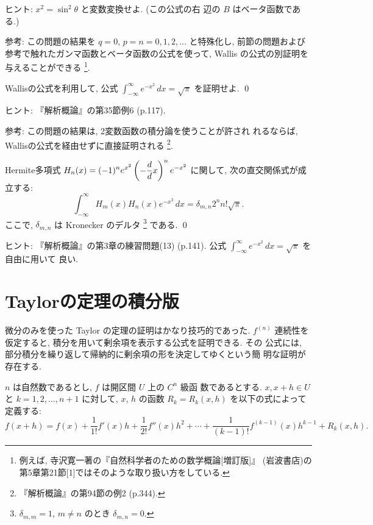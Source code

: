 \documentclass[12pt,twoside]{jarticle}
\begin{document}
\noindent ヒント: $x^2 = \sin^2 \theta$ と変数変換せよ. (この公式の右
辺の $B$ はベータ函数である.)

\noindent 参考: この問題の結果を $q=0$, $p=n=0,1,2,\ldots$ と特殊化し,
前節の問題および参考で触れたガンマ函数とベータ函数の公式を使って,
Wallis の公式の別証明を与えることができる%
\footnote{例えば, 寺沢寛一著の『自然科学者のための数学概論[増訂版]』 
  (岩波書店)の第5章第21節[1]ではそのような取り扱い方をしている.}.

\begin{question}\label{q:int-exp-x2}
  Wallisの公式を利用して, %
  公式 $\displaystyle \int_{-\infty}^\infty e^{-x^2}\,dx = \sqrt{\pi}$ %
  を証明せよ.  \qed
\end{question}

\noindent ヒント: 『解析概論』の第35節例6 (p.117). 

\noindent 参考: この問題の結果は, 2変数函数の積分論を使うことが許され
れるならば, Wallisの公式を経由せずに直接証明される%
\footnote{『解析概論』の第94節の例2 (p.344).}.

\begin{question}[Hermite多項式の直交関係式]
  Hermite多項式 %
  \( \displaystyle
    H_n(x) = (-1)^n e^{x^2} \left( -\frac{d}{d }{x} \right)^n e^{-x^2}
  \) %
  に関して, 次の直交関係式が成立する:
  \[
    \int_{-\infty}^\infty H_m(x) H_n(x) e^{-x^2}\,dx
    = \delta_{m,n} 2^n n! \sqrt{\pi}.
  \]
  ここで, $\delta_{m,n}$ は Kronecker のデルタ%
  \footnote{$\delta_{m,m} = 1$, $m\ne n$ のとき $\delta_{m,n} = 0$.}%
  である. \qed
\end{question}

\noindent ヒント: 『解析概論』の第3章の練習問題(13) (p.141).
公式 $\int_{-\infty}^\infty e^{-x^2}\,dx = \sqrt{\pi}$ を自由に用いて
良い.


\section{Taylorの定理の積分版}

微分のみを使った Taylor の定理の証明はかなり技巧的であった. $f^{(n)}$ %
連続性を仮定すると, 積分を用いて剰余項を表示する公式を証明できる. その
公式には, 部分積分を繰り返して帰納的に剰余項の形を決定してゆくという簡
明な証明が存在する.

$n$ は自然数であるとし, $f$ は開区間 $U$ 上の $C^n$ 級函
数であるとする. %
$x, x + h \in U$ と $k = 1,2,\dots,n+1$ に対して, %
$x$, $h$ の函数 $R_k = R_k(x,h)$ を以下の式によって定義する:
\[
    f(x + h)
    = f(x)
    + \frac{1}{1!}     f'(x)        h
    + \frac{1}{2!}     f''(x)       h^2
    + \cdots
    + \frac{1}{(k-1)!} f^{(k-1)}(x) h^{k-1}
    + R_k(x,h).
\]
\end{document}
